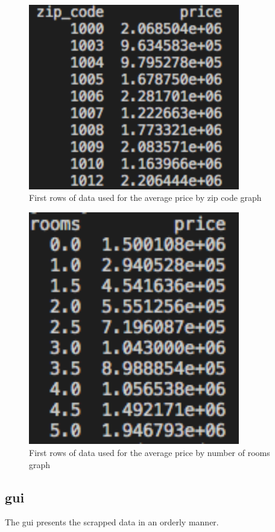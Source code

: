 \documentclass[main]{subfiles}
\begin{document}
\begin{figure}[htbp]
    \centerline{
        \includegraphics[width = 92mm]{prog_16.png}}
    \caption{First rows of data used for the average price by zip code graph}
    \label{fig:graph1}
\end{figure}

\begin{figure}[htbp]
    \centerline{
        \includegraphics[width = 92mm]{prog_17.png}}
    \caption{First rows of data used for the average price by number of rooms graph}
    \label{fig:graph2}
\end{figure}



\subsection{\ac{gui}}
The \ac{gui} presents the scrapped data in an orderly manner.
\end{document}
